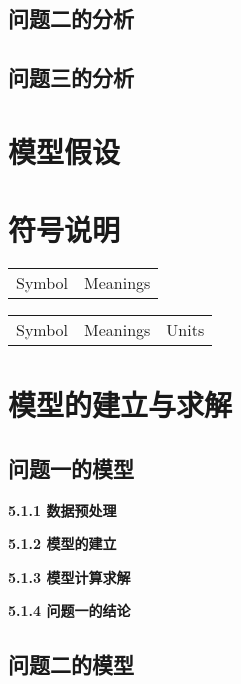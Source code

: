 \documentclass[]{article}   %
\begin{document}
	\subsection{问题二的分析}
	\subsection{问题三的分析}
	\section{模型假设}
	
	\section{符号说明}
	\begin{center}
		\begin{tabular}{cc}
			\hline
			\makebox[0.45\textwidth][c]{符号}	& \makebox[0.45\textwidth][c]{意义}   \\ \hline
			Symbol  & Meanings \\ \hline
		\end{tabular}
	\end{center}
	
	\begin{center}
		\begin{tabular}{ccc}
			\hline
			\makebox[0.25\textwidth][c]{符号}	& \makebox[0.35\textwidth][c]{意义} & \makebox[0.2\textwidth][c]{单位}	 \\ \hline
			Symbol  & Meanings & Units\\ \hline
		\end{tabular}
	\end{center}
	\newpage
	\section{模型的建立与求解}
	\subsection{问题一的模型}
	
	\noindent\textbf{5.1.1 数据预处理}
	
	\noindent\textbf{5.1.2 模型的建立}
	
	\noindent\textbf{5.1.3 模型计算求解}
	
	\noindent\textbf{5.1.4 问题一的结论}
	\subsection{问题二的模型}
\end{document}

